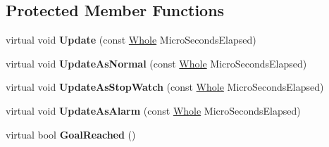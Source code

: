 \subsection*{Protected Member Functions}
\begin{DoxyCompactItemize}
\item 
\hypertarget{classphys_1_1SimpleTimer_a4fa114aae9cf0418edd8a80f307f3906}{
virtual void {\bfseries Update} (const \hyperlink{namespacephys_a460f6bc24c8dd347b05e0366ae34f34a}{Whole} MicroSecondsElapsed)}
\label{d0/d15/classphys_1_1SimpleTimer_a4fa114aae9cf0418edd8a80f307f3906}

\item 
\hypertarget{classphys_1_1SimpleTimer_ab7ff17f3515f07713b65df8887801f0d}{
virtual void {\bfseries UpdateAsNormal} (const \hyperlink{namespacephys_a460f6bc24c8dd347b05e0366ae34f34a}{Whole} MicroSecondsElapsed)}
\label{d0/d15/classphys_1_1SimpleTimer_ab7ff17f3515f07713b65df8887801f0d}

\item 
\hypertarget{classphys_1_1SimpleTimer_a5b9cdf890b478ab1f0bf8d0919df4157}{
virtual void {\bfseries UpdateAsStopWatch} (const \hyperlink{namespacephys_a460f6bc24c8dd347b05e0366ae34f34a}{Whole} MicroSecondsElapsed)}
\label{d0/d15/classphys_1_1SimpleTimer_a5b9cdf890b478ab1f0bf8d0919df4157}

\item 
\hypertarget{classphys_1_1SimpleTimer_a7fcd77c7b49f807cc9e43b3b521d2056}{
virtual void {\bfseries UpdateAsAlarm} (const \hyperlink{namespacephys_a460f6bc24c8dd347b05e0366ae34f34a}{Whole} MicroSecondsElapsed)}
\label{d0/d15/classphys_1_1SimpleTimer_a7fcd77c7b49f807cc9e43b3b521d2056}

\item 
\hypertarget{classphys_1_1SimpleTimer_a435c974da0511d6beafcefb9b987a21c}{
virtual bool {\bfseries GoalReached} ()}
\label{d0/d15/classphys_1_1SimpleTimer_a435c974da0511d6beafcefb9b987a21c}

\end{DoxyCompactItemize}
